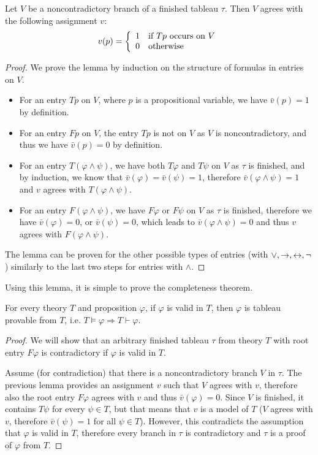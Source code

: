 \begin{lemma}
Let $V$ be a noncontradictory branch of a finished tableau $\tau$. Then $V$ agrees with the following assignment $v$: $$v(p) = \left\{ \begin{array}{ll} 1 & \text{if } Tp \text{ occurs on } V \\ 0 & \text{otherwise} \end{array} \right.$$
\end{lemma}
\begin{proof}
We prove the lemma by induction on the structure of formulas in entries on $V$.
\begin{itemize}
 \item For an entry $T p$ on $V$, where $p$ is a propositional variable, we have $\bar{v}(p)= 1$ by definition.
 \item For an entry $F p$ on $V$, the entry $T p$ is not on $V$ as $V$ is noncontradictory, and thus we have $\bar{v}(p) = 0$ by definition.
 \item For an entry $T (\varphi \land \psi)$, we have both $T \varphi$ and $T \psi$ on $V$ as $\tau$ is finished, and by induction, we know that $\bar{v}(\varphi)=\bar{v}(\psi)=1$, therefore $\bar{v}(\varphi \land \psi)=1$ and $v$ agrees with $T (\varphi \land \psi)$.
 \item For an entry $F (\varphi \land \psi)$, we have $F \varphi$ or $F \psi$ on $V$ as $\tau$ is finished, therefore we have $\bar{v}(\varphi) = 0$, or $\bar{v}(\psi) = 0$, which leads to $\bar{v}(\varphi \land \psi) = 0$ and thus $v$ agrees with $F (\varphi \land \psi)$.
\end{itemize}

The lemma can be proven for the other possible types of entries (with $\lor, \to, \leftrightarrow, \neg$) similarly to the last two steps for entries with $\land$.
\end{proof}

Using this lemma, it is simple to prove the completeness theorem.

\begin{theorem}
For every theory $T$ and proposition $\varphi$, if $\varphi$ is valid in $T$, then $\varphi$ is tableau provable from $T$, i.e. $T \vDash \varphi \Rightarrow T \vdash \varphi$.
\end{theorem}
\begin{proof}
We will show that an arbitrary finished tableau $\tau$ from theory $T$ with root entry $F \varphi$ is contradictory if $\varphi$ is valid in $T$.

Assume (for contradiction) that there is a noncontradictory branch $V$ in $\tau$. The previous lemma provides an assignment $v$ such that $V$ agrees with $v$, therefore also the root entry $F \varphi$ agrees with $v$ and thus $\bar{v}(\varphi) = 0$. Since $V$ is finished, it contains $T \psi$ for every $\psi \in T$, but that means that $v$ is a model of $T$ ($V$ agrees with $v$, therefore $\bar{v}(\psi) = 1$ for all $\psi \in T$). However, this contradicts the assumption that $\varphi$ is valid in $T$, therefore every branch in $\tau$ is contradictory and $\tau$ is a proof of $\varphi$ from $T$. 
\end{proof}

